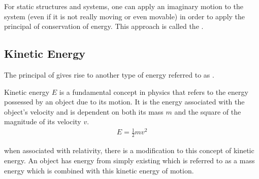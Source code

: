 For static structures and systems, one can apply an imaginary motion to the system (even if it is not really moving or even movable) in order to apply the principal of conservation of energy. This approach is called the .

\subsection{Kinetic Energy}

The principal of  gives rise to another type of energy referred to as .

\begin{defn}
	Kinetic energy $E$ is a fundamental concept in physics that refers to the energy possessed by an object due to its motion. It is the energy associated with the object's velocity and is dependent on both its mass $m$ and the square of the magnitude of its velocity $v$. 
	\begin{align}
		E = \frac{1}{2}mv^2
	\end{align}
\end{defn} 

when associated with relativity, there is a modification to this concept of kinetic energy. An object has energy from simply existing which is referred to as a mass energy which is combined with this kinetic energy of motion.







